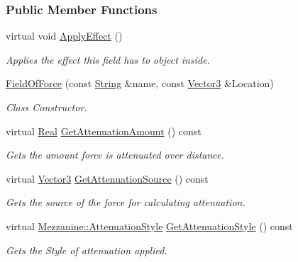 \subsubsection*{Public Member Functions}
\begin{DoxyCompactItemize}
\item 
virtual void \hyperlink{classMezzanine_1_1FieldOfForce_ae82e9a45515d40513ad1ac2e606c627b}{ApplyEffect} ()
\begin{DoxyCompactList}\small\item\em Applies the effect this field has to object inside. \item\end{DoxyCompactList}\item 
\hyperlink{classMezzanine_1_1FieldOfForce_aa212c5cde10986e1d511a3843af9428c}{FieldOfForce} (const \hyperlink{namespaceMezzanine_acf9fcc130e6ebf08e3d8491aebcf1c86}{String} \&name, const \hyperlink{classMezzanine_1_1Vector3}{Vector3} \&Location)
\begin{DoxyCompactList}\small\item\em Class Constructor. \item\end{DoxyCompactList}\item 
virtual \hyperlink{namespaceMezzanine_a726731b1a7df72bf3583e4a97282c6f6}{Real} \hyperlink{classMezzanine_1_1FieldOfForce_a0f5340224f7cec6e9086d49a3d51ae07}{GetAttenuationAmount} () const 
\begin{DoxyCompactList}\small\item\em Gets the amount force is attenuated over distance. \item\end{DoxyCompactList}\item 
virtual \hyperlink{classMezzanine_1_1Vector3}{Vector3} \hyperlink{classMezzanine_1_1FieldOfForce_a0f1232162d04d967907a55e8c9bc8661}{GetAttenuationSource} () const 
\begin{DoxyCompactList}\small\item\em Gets the source of the force for calculating attenuation. \item\end{DoxyCompactList}\item 
virtual \hyperlink{namespaceMezzanine_a2d10a79e11a2031df10af540eede12fa}{Mezzanine::AttenuationStyle} \hyperlink{classMezzanine_1_1FieldOfForce_a45f3ea5f8a48ff4a7dbe135d5003d267}{GetAttenuationStyle} () const 
\begin{DoxyCompactList}\small\item\em Gets the Style of attenuation applied. \item\end{DoxyCompactList}\item 

\end{DoxyCompactItemize}
